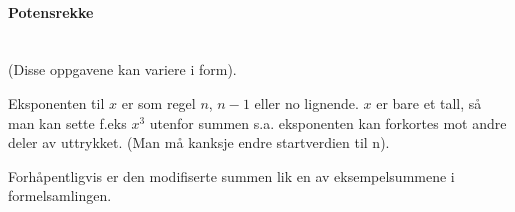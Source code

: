 \paragraph{Potensrekke} \mbox{} \\
(Disse oppgavene kan variere i form).

Eksponenten til $x$ er som regel $n$, $n-1$ eller no lignende.
$x$ er bare et tall, så man kan sette f.eks $x^3$ utenfor summen
s.a. eksponenten kan forkortes mot andre deler av uttrykket.
(Man må kanksje endre startverdien til n).

Forhåpentligvis er den modifiserte summen lik en av
eksempelsummene i formelsamlingen.
